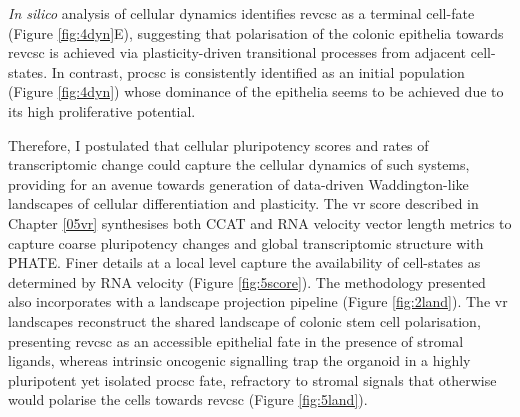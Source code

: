 \emph{In silico} analysis of cellular dynamics identifies \acrshort{revcsc} as a terminal cell-fate (Figure \ref{fig:4dyn}E), suggesting that polarisation of the colonic epithelia towards \acrshort{revcsc} is achieved via plasticity-driven transitional processes from adjacent cell-states. In contrast, \acrshort{procsc} is consistently identified as an initial population (Figure \ref{fig:4dyn}) whose dominance of the epithelia seems to be achieved due to its high proliferative potential.

Therefore, I postulated that cellular pluripotency scores and rates of transcriptomic change could capture the cellular dynamics of such systems, providing for an avenue towards generation of data-driven Waddington-like landscapes of cellular differentiation and plasticity. The \acrfull{vr} score described in Chapter \ref{05vr} synthesises both CCAT and RNA velocity vector length metrics to capture coarse pluripotency changes and global transcriptomic structure with PHATE. Finer details at a local level capture the availability of cell-states as determined by RNA velocity (Figure \ref{fig:5score}). The methodology presented also incorporates with a landscape projection pipeline (Figure \ref{fig:2land}). The \acrshort{vr} landscapes reconstruct the shared landscape of colonic stem cell polarisation, presenting \acrshort{revcsc} as an accessible epithelial fate in the presence of stromal ligands, whereas intrinsic oncogenic signalling trap the organoid in a highly pluripotent yet isolated \acrshort{procsc} fate, refractory to stromal signals that otherwise would polarise the cells towards \acrshort{revcsc} (Figure \ref{fig:5land}). 

